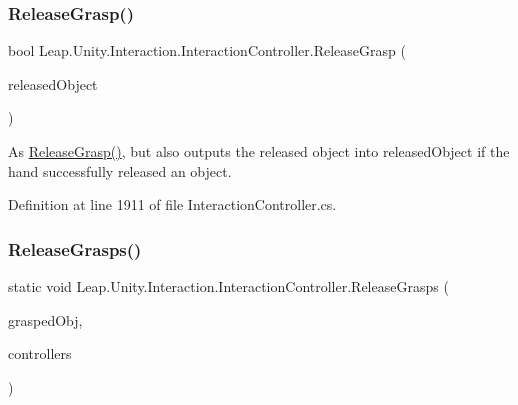 \subsubsection{\texorpdfstring{ReleaseGrasp()}{ReleaseGrasp()}\hspace{0.1cm}{\footnotesize\ttfamily [2/2]}}
{\footnotesize\ttfamily bool Leap.\+Unity.\+Interaction.\+Interaction\+Controller.\+Release\+Grasp (\begin{DoxyParamCaption}\item[{out \mbox{\hyperlink{interface_leap_1_1_unity_1_1_interaction_1_1_i_interaction_behaviour}{I\+Interaction\+Behaviour}}}]{released\+Object }\end{DoxyParamCaption})}



As \mbox{\hyperlink{class_leap_1_1_unity_1_1_interaction_1_1_interaction_controller_a3468a89e21c685d6df962ce70684c92f}{Release\+Grasp()}}, but also outputs the released object into released\+Object if the hand successfully released an object. 



Definition at line 1911 of file Interaction\+Controller.\+cs.

\mbox{\label{class_leap_1_1_unity_1_1_interaction_1_1_interaction_controller_abbf648deb30c375dc846e7af2166dd26}} 
\subsubsection{\texorpdfstring{ReleaseGrasps()}{ReleaseGrasps()}}
{\footnotesize\ttfamily static void Leap.\+Unity.\+Interaction.\+Interaction\+Controller.\+Release\+Grasps (\begin{DoxyParamCaption}\item[{\mbox{\hyperlink{interface_leap_1_1_unity_1_1_interaction_1_1_i_interaction_behaviour}{I\+Interaction\+Behaviour}}}]{grasped\+Obj,  }\item[{\mbox{\hyperlink{struct_leap_1_1_unity_1_1_readonly_hash_set}{Readonly\+Hash\+Set}}$<$ \mbox{\hyperlink{class_leap_1_1_unity_1_1_interaction_1_1_interaction_controller}{Interaction\+Controller}} $>$}]{controllers }\end{DoxyParamCaption})\hspace{0.3cm}{\ttfamily [static]}}



